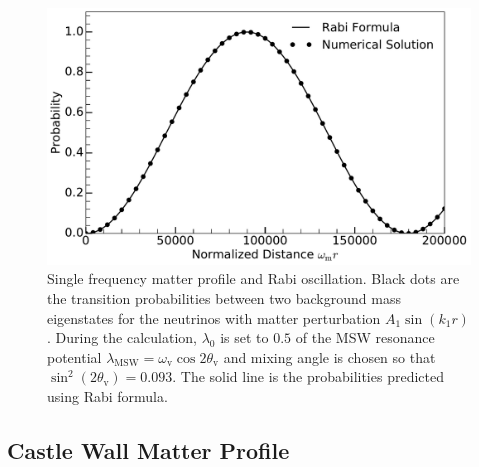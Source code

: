\documentclass[%
reprint,
 amsmath,amssymb,
 aps,
]{revtex4-1}
\begin{document}
\begin{figure}
                \centering
                \includegraphics[width=\columnwidth]{assets/rabiOscillationsNeutrinoCoincidence-single-frequency}
                \caption{Single frequency matter profile and Rabi oscillation.  Black dots are the transition probabilities between two background mass eigenstates for the neutrinos with matter perturbation $A_1\sin(k_1 r)$. During the calculation, $\lambda_0$ is set to $0.5$ of the MSW resonance potential $\lambda_{\mathrm{MSW}}=\omega_{\mathrm{v}}\cos 2\theta_{\mathrm v}$ and mixing angle is chosen so that $\sin^2(2\theta_{\mathrm v}) = 0.093$. The solid line is the probabilities predicted using Rabi formula.}
                \label{fig-rabiOscillationsNeutrinoCoincidence}
\end{figure}






\subsection{Castle Wall Matter Profile}
\end{document}
